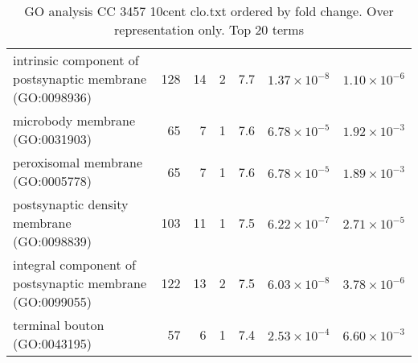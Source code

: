\begin{table}[ht]
\begin{adjustbox}{width=\textwidth}
\begin{tabular}{lrrrrrr}
  intrinsic component of postsynaptic membrane (GO:0098936) & 128 & 14 & 2 & 7.7 & $1.37 \times 10^{-8}$ & $1.10 \times 10^{-6}$ \\ 
  microbody membrane (GO:0031903) & 65 & 7 & 1 & 7.6 & $6.78 \times 10^{-5}$ & $1.92 \times 10^{-3}$ \\ 
  peroxisomal membrane (GO:0005778) & 65 & 7 & 1 & 7.6 & $6.78 \times 10^{-5}$ & $1.89 \times 10^{-3}$ \\ 
  postsynaptic density membrane (GO:0098839) & 103 & 11 & 1 & 7.5 & $6.22 \times 10^{-7}$ & $2.71 \times 10^{-5}$ \\ 
  integral component of postsynaptic membrane (GO:0099055) & 122 & 13 & 2 & 7.5 & $6.03 \times 10^{-8}$ & $3.78 \times 10^{-6}$ \\ 
  terminal bouton (GO:0043195) & 57 & 6 & 1 & 7.4 & $2.53 \times 10^{-4}$ & $6.60 \times 10^{-3}$ \\ 
   \hline
\end{tabular}
\end{adjustbox}
\caption{GO analysis CC 3457 10cent clo.txt ordered by fold change. Over representation only. Top 20 terms} 
\label{tab:GO analysis CC 3457 10cent clo.txt ordered by fold change. Over representation only. Top 20 terms}
\end{table}


